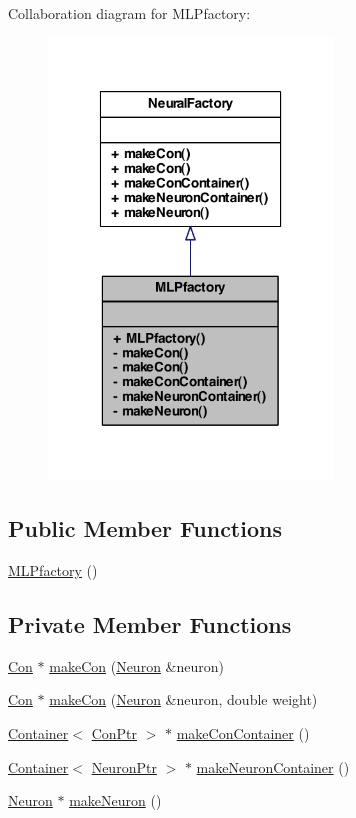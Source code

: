 Collaboration diagram for MLPfactory:\nopagebreak
\begin{figure}[H]
\begin{center}
\leavevmode
\includegraphics[width=214pt]{class_m_l_pfactory__coll__graph}
\end{center}
\end{figure}
\subsection*{Public Member Functions}
\begin{DoxyCompactItemize}
\item 
\hyperlink{class_m_l_pfactory_a61dfce37d0344c58e275e8508b0a474c}{MLPfactory} ()
\end{DoxyCompactItemize}
\subsection*{Private Member Functions}
\begin{DoxyCompactItemize}
\item 
\hyperlink{class_con}{Con} $\ast$ \hyperlink{class_m_l_pfactory_a479b674ed4e63bb1178c091325c2cd61}{makeCon} (\hyperlink{class_neuron}{Neuron} \&neuron)
\item 
\hyperlink{class_con}{Con} $\ast$ \hyperlink{class_m_l_pfactory_a18c3770c3cb2ed6c3cb402cb814b209c}{makeCon} (\hyperlink{class_neuron}{Neuron} \&neuron, double weight)
\item 
\hyperlink{class_container}{Container}$<$ \hyperlink{_a_m_o_r_e_8h_a169bb8e5f26ce70bf2b10dec2fb5ee50}{ConPtr} $>$ $\ast$ \hyperlink{class_m_l_pfactory_a62ea35a5b7ce5f139f91b2c3edd4ad61}{makeConContainer} ()
\item 
\hyperlink{class_container}{Container}$<$ \hyperlink{_a_m_o_r_e_8h_ac1ea936c2c7728eb382278131652fef4}{NeuronPtr} $>$ $\ast$ \hyperlink{class_m_l_pfactory_a18bbb914f7b974c0f8c5dd3913f6dd1c}{makeNeuronContainer} ()
\item 
\hyperlink{class_neuron}{Neuron} $\ast$ \hyperlink{class_m_l_pfactory_ac39058170421f03dfd88c2ced318f46b}{makeNeuron} ()
\end{DoxyCompactItemize}


